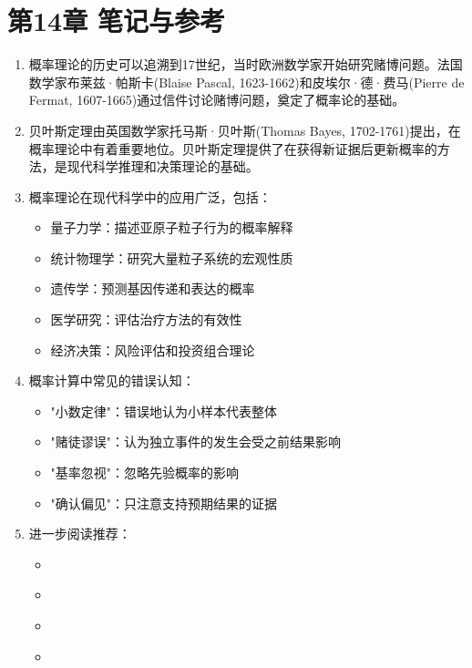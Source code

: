 \section*{第14章 笔记与参考}

\begin{enumerate}
\item 概率理论的历史可以追溯到17世纪，当时欧洲数学家开始研究赌博问题。法国数学家布莱兹·帕斯卡(Blaise Pascal, 1623-1662)和皮埃尔·德·费马(Pierre de Fermat, 1607-1665)通过信件讨论赌博问题，奠定了概率论的基础。

\item 贝叶斯定理由英国数学家托马斯·贝叶斯(Thomas Bayes, 1702-1761)提出，在概率理论中有着重要地位。贝叶斯定理提供了在获得新证据后更新概率的方法，是现代科学推理和决策理论的基础。

\item 概率理论在现代科学中的应用广泛，包括：
   \begin{itemize}
   \item 量子力学：描述亚原子粒子行为的概率解释
   \item 统计物理学：研究大量粒子系统的宏观性质
   \item 遗传学：预测基因传递和表达的概率
   \item 医学研究：评估治疗方法的有效性
   \item 经济决策：风险评估和投资组合理论
   \end{itemize}

\item 概率计算中常见的错误认知：
   \begin{itemize}
   \item "小数定律"：错误地认为小样本代表整体
   \item "赌徒谬误"：认为独立事件的发生会受之前结果影响
   \item "基率忽视"：忽略先验概率的影响
   \item "确认偏见"：只注意支持预期结果的证据
   \end{itemize}

\item 进一步阅读推荐：
   \begin{itemize}
   \item \cite{hacking1975}
   \item \cite{gigerenzer2002}
   \item \cite{kahneman2011}
   \item \cite{pearl2000}
   \end{itemize}
\end{enumerate}

